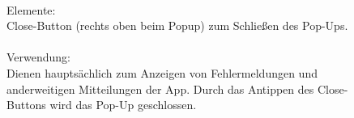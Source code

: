 \documentclass[a4paper]{scrreprt}
\begin{document}
\begin{figure}[h!]
\begin{minipage}[b]{0.55\linewidth}
    			\hfill 
    			\\Elemente:\\
    			Close-Button (rechts oben beim Popup) zum 
    			Schließen des Pop-Ups.\\
    			
    				
    			
    			\hfill
    			\\
    			
    			Verwendung:\\
    			Dienen hauptsächlich zum Anzeigen von
    			Fehlermeldungen und anderweitigen
    			Mitteilungen der App. Durch das Antippen des 
    			Close-Buttons wird das Pop-Up geschlossen.
    			
    			
    			\vspace{17mm}
    			
    		\end{minipage}
    	\end{figure}
    	
    	\clearpage
    	
\end{document}
